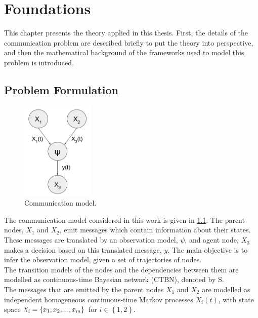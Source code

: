 \chapter{Foundations}
\label{chap:2}

This chapter presents the theory applied in this thesis. First, the details of the communication problem are described briefly to put the theory into perspective, and then the mathematical background of the frameworks used to model this problem is introduced. 

\section{Problem Formulation}
\label{sec:prob_formulation}

\begin{figure}
	\begin{center}
		\includegraphics[width=3.5cm]{figures/simple_graph}
		\caption{Communication model.}
		\label{fig:graph_model}
	\end{center}
\end{figure} 
The communication model considered in this work is given in \cref{fig:graph_model}. The parent nodes, $X_{1}$ and $ X_{2}$, emit messages which contain information about their states. These messages are translated by an observation model, $\psi$, and agent node, $ X_{3} $ makes a decision based on this translated message, $ y $. The main objective is to infer the observation model, given a set of trajectories of nodes.\\
The transition models of the nodes and the dependencies between them are modelled as continuous-time Bayesian network (CTBN), denoted by S. \\%
The messages that are emitted by the parent nodes $X_{1}$ and $ X_{2} $ are modelled as independent homogeneous continuous-time Markov processes $X_{i}(t)$, with state space $ \rchi_{i} = \left\lbrace x_{1}, x_{2}, ..., x_{m} \right\rbrace  $ for $ i \in \left\lbrace 1,2 \right\rbrace $.\\
